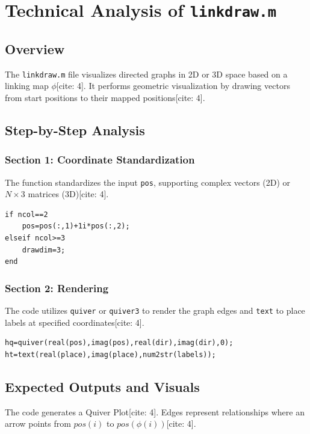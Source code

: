 
\chapter{Technical Analysis of \texttt{linkdraw.m}}
\date{March 10, 2026}


\maketitle

\section{Overview}
The \texttt{linkdraw.m} file visualizes directed graphs in 2D or 3D space based on a linking map $\phi$[cite: 4]. It performs geometric visualization by drawing vectors from start positions to their mapped positions[cite: 4].

\section{Step-by-Step Analysis}

\subsection{Section 1: Coordinate Standardization}
The function standardizes the input \texttt{pos}, supporting complex vectors (2D) or $N \times 3$ matrices (3D)[cite: 4].
\begin{lstlisting}
if ncol==2 
    pos=pos(:,1)+1i*pos(:,2);
elseif ncol>=3 
    drawdim=3; 
end
\end{lstlisting}

\subsection{Section 2: Rendering}
The code utilizes \texttt{quiver} or \texttt{quiver3} to render the graph edges and \texttt{text} to place labels at specified coordinates[cite: 4].
\begin{lstlisting}
hq=quiver(real(pos),imag(pos),real(dir),imag(dir),0);
ht=text(real(place),imag(place),num2str(labels));
\end{lstlisting}

\section{Expected Outputs and Visuals}
The code generates a Quiver Plot[cite: 4]. Edges represent relationships where an arrow points from $pos(i)$ to $pos(\phi(i))$[cite: 4].
